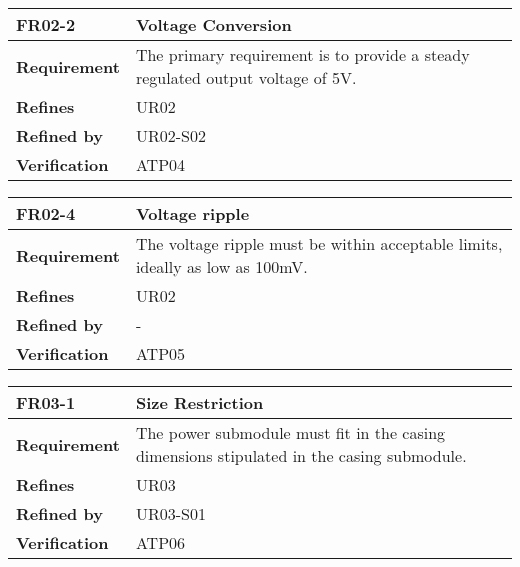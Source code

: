 \documentclass[class=report,11pt,crop=false]{standalone}
\begin{document}
 

\begin{table}
\centering

\begin{tabular}{|>{\raggedright\arraybackslash}p{0.2\linewidth}|>{\raggedright\arraybackslash}p{0.8\linewidth}|}
\hline
\textbf{FR02-2} & \textbf{Voltage Conversion} \\
\hline
\textbf{Requirement} & The primary requirement is to provide a steady regulated output voltage of 5V. \\
\hline
\textbf{Refines} & UR02 \\
\hline
\textbf{Refined by} & UR02-S02 \\
\hline
\textbf{Verification} & ATP04 \\
\hline

\end{tabular}

\end{table}

 

\begin{table}
\centering

\begin{tabular}{|>{\raggedright\arraybackslash}p{0.2\linewidth}|>{\raggedright\arraybackslash}p{0.8\linewidth}|}
\hline
\textbf{FR02-4} & \textbf{Voltage ripple} \\
\hline
\textbf{Requirement} & The voltage ripple must be within acceptable limits, ideally as low as 100mV. \\
\hline
\textbf{Refines} & UR02 \\
\hline
\textbf{Refined by} & - \\
\hline
\textbf{Verification} & ATP05 \\
\hline

\end{tabular}

\end{table}

 

\begin{table}
\centering

\begin{tabular}{|>{\raggedright\arraybackslash}p{0.2\linewidth}|>{\raggedright\arraybackslash}p{0.8\linewidth}|}
\hline
\textbf{FR03-1} & \textbf{Size Restriction} \\
\hline
\textbf{Requirement} & The power submodule must fit in the casing dimensions stipulated in the casing submodule. \\
\hline
\textbf{Refines} & UR03 \\
\hline
\textbf{Refined by} & UR03-S01 \\
\hline
\textbf{Verification} & ATP06 \\
\hline

\end{tabular}

\end{table}
\end{document}
